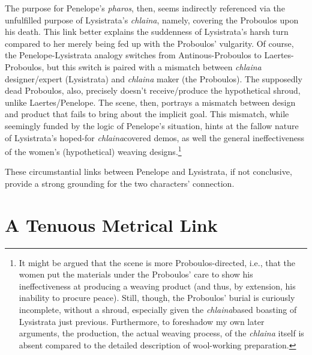 \documentclass[12pt]{article}
\begin{document}
The purpose for Penelope's \textit{pharos}, then, seems indirectly referenced via the unfulfilled purpose of Lysistrata's \textit{chlaina}, namely, covering the Proboulos upon his death. This link better explains the suddenness of Lysistrata's harsh turn compared to her merely being fed up with the Proboulos' vulgarity. Of course, the Penelope-Lysistrata analogy switches from Antinous-Proboulos to Laertes-Proboulos, but this switch is paired with a mismatch between \textit{chlaina} designer/expert (Lysistrata) and \textit{chlaina} maker (the Proboulos). The supposedly dead Proboulos, also, precisely doesn't receive/produce the hypothetical shroud, unlike Laertes/Penelope. The scene, then, portrays a mismatch between design and product that fails to bring about the implicit goal. This mismatch, while seemingly funded by the logic of Penelope's situation, hints at the fallow nature of Lysistrata's hoped-for \textit{chlaina}\-covered demos, as well the general ineffectiveness of the women's (hypothetical) weaving designs.\footnote{It might be argued that the scene is more Proboulos-directed, i.e., that the women put the materials under the Proboulos' care to show his ineffectiveness at producing a weaving product (and thus, by extension, his inability to procure peace). Still, though, the Proboulos' burial is curiously incomplete, without a shroud, especially given the \textit{chlaina}\-based boasting of Lysistrata just previous. Furthermore, to foreshadow my own later arguments, the production, the actual weaving process, of the \textit{chlaina} itself is absent compared to the detailed description of wool-working preparation.}

These circumstantial links between Penelope and Lysistrata, if not conclusive, provide a strong grounding for the two characters' connection.

\section{A Tenuous Metrical Link}
\end{document}
